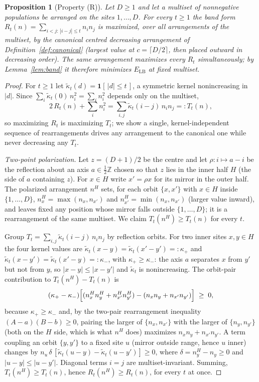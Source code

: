 \documentclass[11pt]{article}
\newtheorem{proposition}{Proposition}
\theoremstyle{remark}
\newcommand{\LB}{\mathrm{LB}}
\begin{document}
\begin{proposition}[Property (R)]\label{prop:R}
Let $D\ge1$ and let a multiset of nonnegative populations be arranged on the sites $1,\dots,D$. For every $t\ge1$ the band form $R_t(n)=\sum_{i<j:\,|i-j|\le t} n_i n_j$ is maximized, over all arrangements of the multiset, by the canonical centred decreasing arrangement of Definition~\ref{def:canonical} (largest value at $c=\lceil D/2\rceil$, then placed outward in decreasing order). The same arrangement maximizes every $R_t$ simultaneously; by Lemma~\ref{lem:band} it therefore minimizes $E_\LB$ at fixed multiset.
\end{proposition}

\begin{proof}
For $t\ge1$ let $\tilde\kappa_t(d)=\mathbf 1[\,|d|\le t\,]$, a symmetric kernel nonincreasing in $|d|$. Since $\sum_i \tilde\kappa_t(0)\,n_i^2=\sum_i n_i^2$ depends only on the multiset,
\[
2\,R_t(n) + \sum_i n_i^2 = \sum_{i,j}\tilde\kappa_t(i-j)\,n_i n_j =: T_t(n),
\]
so maximizing $R_t$ is maximizing $T_t$; we show a single, kernel-independent sequence of rearrangements drives any arrangement to the canonical one while never decreasing any $T_t$.

\emph{Two-point polarization.} Let $z=(D+1)/2$ be the centre and let $\rho: i\mapsto a-i$ be the reflection about an axis $a\in\tfrac12\mathbb Z$ chosen so that $z$ lies in the inner half $H$ (the side of $a$ containing $z$). For $x\in H$ write $x'=\rho x$ for its mirror in the outer half. The polarized arrangement $n^H$ sets, for each orbit $\{x,x'\}$ with $x\in H$ inside $\{1,\dots,D\}$, $n^H_x=\max(n_x,n_{x'})$ and $n^H_{x'}=\min(n_x,n_{x'})$ (larger value inward), and leaves fixed any position whose mirror falls outside $\{1,\dots,D\}$; it is a rearrangement of the same multiset. We claim $T_t(n^H)\ge T_t(n)$ for every $t$.

Group $T_t=\sum_{i,j}\tilde\kappa_t(i-j)\,n_i n_j$ by reflection orbits. For two inner sites $x,y\in H$ the four kernel values are $\tilde\kappa_t(x-y)=\tilde\kappa_t(x'-y')=:\kappa_+$ and $\tilde\kappa_t(x-y')=\tilde\kappa_t(x'-y)=:\kappa_-$, with $\kappa_+\ge\kappa_-$: the axis $a$ separates $x$ from $y'$ but not from $y$, so $|x-y|\le|x-y'|$ and $\tilde\kappa_t$ is nonincreasing. The orbit-pair contribution to $T_t(n^H)-T_t(n)$ is
\[
(\kappa_+-\kappa_-)\Bigl[(n^H_x n^H_y + n^H_{x'} n^H_{y'}) - (n_x n_y + n_{x'} n_{y'})\Bigr] \;\ge\; 0,
\]
because $\kappa_+\ge\kappa_-$ and, by the two-pair rearrangement inequality $(A-a)(B-b)\ge0$, pairing the larger of $\{n_x,n_{x'}\}$ with the larger of $\{n_y,n_{y'}\}$ (both on the $H$ side, which is what $n^H$ does) maximizes $n_x n_y + n_{x'} n_{y'}$. A term coupling an orbit $\{y,y'\}$ to a fixed site $u$ (mirror outside range, hence $u$ inner) changes by $n_u\,\delta\,[\tilde\kappa_t(u-y)-\tilde\kappa_t(u-y')]\ge0$, where $\delta=n^H_y-n_y\ge0$ and $|u-y|\le|u-y'|$. Diagonal terms $i=j$ are multiset-invariant. Summing, $T_t(n^H)\ge T_t(n)$, hence $R_t(n^H)\ge R_t(n)$, for every $t$ at once.


\end{proof}
\end{document}
